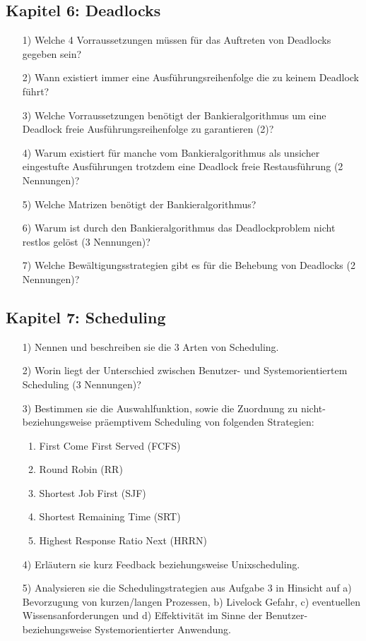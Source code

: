 \documentclass[11pt,a4paper]{article}
\begin{document}
\subsection*{Kapitel 6: Deadlocks}
\begin{itemize}
\item[1)] Welche 4 Vorraussetzungen müssen für das Auftreten von Deadlocks gegeben sein?
\item[2)] Wann existiert immer eine Ausführungsreihenfolge die zu keinem Deadlock führt?
\item[3)] Welche Vorraussetzungen benötigt der Bankieralgorithmus um eine Deadlock freie Ausführungsreihenfolge zu garantieren (2)?
\item[4)] Warum existiert für manche vom Bankieralgorithmus als unsicher eingestufte Ausführungen trotzdem eine Deadlock freie Restausführung (2 Nennungen)?
\item[5)] Welche Matrizen benötigt der Bankieralgorithmus?
\item[6)] Warum ist durch den Bankieralgorithmus das Deadlockproblem nicht restlos gelöst (3 Nennungen)?
\item[7)] Welche Bewältigungsstrategien gibt es für die Behebung von Deadlocks (2 Nennungen)?
\end{itemize}


\pagebreak


\subsection*{Kapitel 7: Scheduling}
\begin{itemize}
\item[1)] Nennen und beschreiben sie die 3 Arten von Scheduling.
\item[2)] Worin liegt der Unterschied zwischen Benutzer- und Systemorientiertem Scheduling (3 Nennungen)?
\item[3)] Bestimmen sie die Auswahlfunktion, sowie die Zuordnung zu nicht- beziehungsweise präemptivem Scheduling von folgenden Strategien:
\begin{enumerate}
\item First Come First Served (FCFS)
\item Round Robin (RR)
\item Shortest Job First (SJF)
\item Shortest Remaining Time (SRT)
\item Highest Response Ratio Next (HRRN)
\end{enumerate}
\item[4)] Erläutern sie kurz Feedback beziehungsweise Unixscheduling.
\item[5)] Analysieren sie die Schedulingstrategien aus Aufgabe 3 in Hinsicht auf a) Bevorzugung von kurzen/langen Prozessen, b) Livelock Gefahr, c) eventuellen Wissensanforderungen und d) Effektivität im Sinne der Benutzer- beziehungsweise Systemorientierter Anwendung.
\end{itemize}
\end{document}
